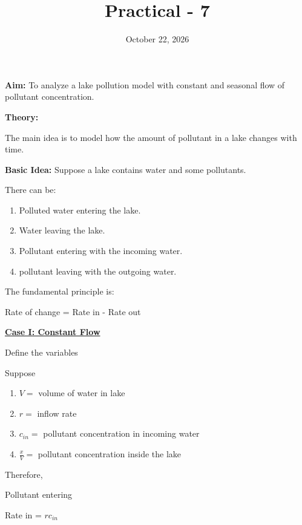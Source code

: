 \documentclass{article}
\title{\textbf{Practical - 7}}
\author{}
\date{October 22, 2026}
\begin{document}
\maketitle

\noindent
\textbf{\large{Aim:}} To analyze a lake pollution model with constant and seasonal flow of pollutant concentration.

\vspace{1em}
\noindent
\textbf{\large{Theory:}} 

\noindent
The main idea is to model how the amount of pollutant in a lake changes with time.

\vspace{0.5em}
\noindent
\textbf{Basic Idea:} Suppose a lake contains water and some pollutants.

\noindent
There can be:
\begin{enumerate}
    \item Polluted water entering the lake.
    \item Water leaving the lake.
    \item Pollutant entering with the incoming water.
    \item pollutant leaving with the outgoing water.
\end{enumerate}

\noindent
The fundamental principle is:
\begin{center}
    Rate of change = Rate in - Rate out
\end{center}

\vspace{2em}
\noindent
\begin{center}
\textbf{\underline{Case I: Constant Flow}}
\end{center}

\noindent
Define the variables

\noindent
Suppose
\begin{enumerate}
    \item $V =$ volume of water in lake
    \item $r =$ inflow rate
    \item $c_{in} =$ pollutant concentration in incoming water
    \item $\frac{x}{V} =$ pollutant concentration inside the lake
\end{enumerate}

\noindent
Therefore,

\noindent
Pollutant entering 
\begin{center}
    Rate in = $rc_{in}$
\end{center}
\end{document}
